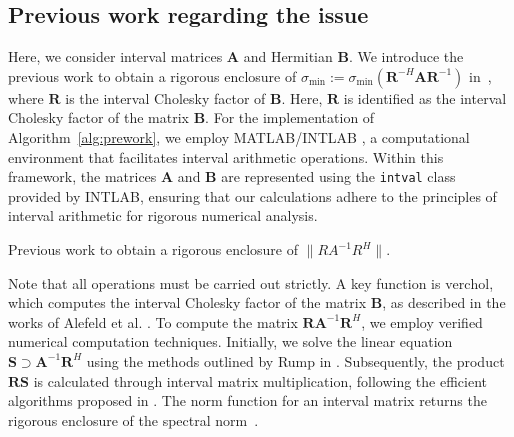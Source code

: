 \subsection{Previous work regarding the issue}

Here, we consider interval matrices $\bm{A}$ and Hermitian $\bm{B}$.
We introduce the previous work to obtain a rigorous enclosure of $\sigma_{\min}:=\sigma_{\min}(\bm{R}^{-H}\bm{A}\bm{R}^{-1})$ in~\cite[p. 440]{nakao2019numerical}, where $\bm{R}$ is the interval Cholesky factor of $\bm{B}$.
Here, $\bm{R}$ is identified as the interval Cholesky factor of the matrix $\bm{B}$. For the implementation of Algorithm~\ref{alg:prework}, we employ MATLAB/INTLAB \cite{Ru99a}, a computational environment that facilitates interval arithmetic operations. Within this framework, the matrices $\bm{A}$ and $\bm{B}$ are represented using the {\tt intval} class provided by INTLAB, ensuring that our calculations adhere to the principles of interval arithmetic for rigorous numerical analysis.

\begin{algorithm}
\caption{Previous work  to obtain a rigorous enclosure of $\|RA^{-1}R^{H}\|$.}\label{alg:prework}
\begin{algorithmic}
\end{algorithmic}
\end{algorithm}

Note that all operations must be carried out strictly.
A key function is $\mathrm{verchol}$, which computes the interval Cholesky factor of the matrix $\bm{B}$, as described in the works of Alefeld et al. \cite{alefeld1993cholesky,alefeld2009new}.
To compute the matrix $\bm{R}\bm A^{-1}\bm{R}^{H}$, we employ verified numerical computation techniques. 
Initially, we solve the linear equation $\bm{S}\supset \bm A^{-1}\bm{R}^{H}$ using the methods outlined by Rump in \cite{rump2013accurate1,rump2013accurate2}. Subsequently, the product $\bm{R}\bm{S}$ is calculated through interval matrix multiplication, following the efficient algorithms proposed in \cite{oishi2002fast,rump2012fast,ogita2005fast,ozaki2012fast}.
The $\mathrm{norm}$ function for an interval matrix returns the rigorous enclosure of the spectral norm~\cite{rump2011verified}.